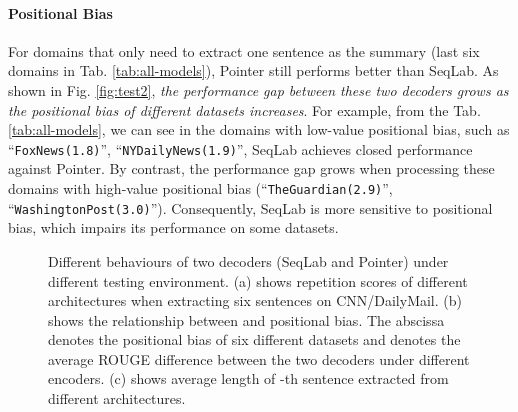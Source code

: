 \documentclass[11pt,a4paper]{article}
\begin{document}
\paragraph{Positional Bias} For domains that only need to extract one sentence as the summary (last six domains in Tab. \ref{tab:all-models}), Pointer still performs better than SeqLab. As shown in Fig. \ref{fig:test2}, \textit{the performance gap between these two decoders grows as the positional bias of different datasets increases}. For example, from the Tab. \ref{tab:all-models}, we can see in the domains with low-value positional bias, such as ``\texttt{FoxNews(1.8)}'', ``\texttt{NYDailyNews(1.9)}'', SeqLab achieves closed performance against Pointer. By contrast, the performance gap grows when processing these domains with high-value positional bias (``\texttt{TheGuardian(2.9)}'', ``\texttt{WashingtonPost(3.0)}''). Consequently, SeqLab is more sensitive to positional bias, which impairs its performance on some datasets.



\begin{figure*}[t]
  \centering

 \label{fig:three-testing}
 \caption{Different behaviours of two decoders (SeqLab and Pointer) under different testing environment. (a) shows repetition scores of different architectures when extracting six sentences on CNN/DailyMail. (b) shows the relationship between   and positional bias. The abscissa denotes the positional bias of six different datasets and  denotes the average ROUGE difference between the two decoders under different encoders. (c) shows average length of -th sentence extracted from different architectures.}
\end{figure*}
\end{document}
